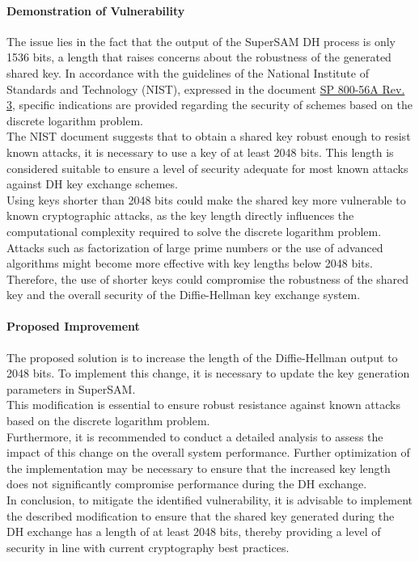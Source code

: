 \documentclass[12pt]{article}
\begin{document}
    \paragraph{Demonstration of Vulnerability}
    The issue lies in the fact that the output of the SuperSAM DH process is only 1536 bits, a length that raises concerns about the robustness of the generated shared key. In accordance with the guidelines of the National Institute of Standards and Technology (NIST), expressed in the document \href{https://nvlpubs.nist.gov/nistpubs/SpecialPublications/NIST.SP.800-56Ar3.pdf}{SP 800-56A Rev. 3}, specific indications are provided regarding the security of schemes based on the discrete logarithm problem.
    \\
    The NIST document suggests that to obtain a shared key robust enough to resist known attacks, it is necessary to use a key of at least 2048 bits. This length is considered suitable to ensure a level of security adequate for most known attacks against DH key exchange schemes.
    \\
    Using keys shorter than 2048 bits could make the shared key more vulnerable to known cryptographic attacks, as the key length directly influences the computational complexity required to solve the discrete logarithm problem. Attacks such as factorization of large prime numbers or the use of advanced algorithms might become more effective with key lengths below 2048 bits. Therefore, the use of shorter keys could compromise the robustness of the shared key and the overall security of the Diffie-Hellman key exchange system.

    \paragraph{Proposed Improvement}
    The proposed solution is to increase the length of the Diffie-Hellman output to 2048 bits. To implement this change, it is necessary to update the key generation parameters in SuperSAM.
    \\
    This modification is essential to ensure robust resistance against known attacks based on the discrete logarithm problem.
    \\
    Furthermore, it is recommended to conduct a detailed analysis to assess the impact of this change on the overall system performance. Further optimization of the implementation may be necessary to ensure that the increased key length does not significantly compromise performance during the DH exchange.
    \\
    In conclusion, to mitigate the identified vulnerability, it is advisable to implement the described modification to ensure that the shared key generated during the DH exchange has a length of at least 2048 bits, thereby providing a level of security in line with current cryptography best practices.
\end{document}
